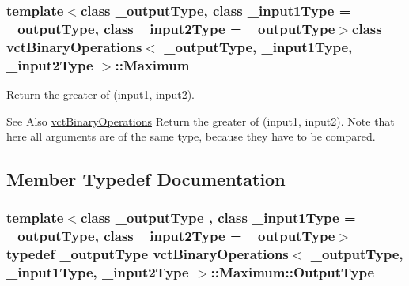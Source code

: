 \subsubsection*{template$<$class \-\_\-output\-Type, class \-\_\-input1\-Type = \-\_\-output\-Type, class \-\_\-input2\-Type = \-\_\-output\-Type$>$class vct\-Binary\-Operations$<$ \-\_\-output\-Type, \-\_\-input1\-Type, \-\_\-input2\-Type $>$\-::\-Maximum}

Return the greater of (input1, input2). 

\begin{DoxySeeAlso}{See Also}
\hyperlink{classvct_binary_operations}{vct\-Binary\-Operations} Return the greater of (input1, input2). Note that here all arguments are of the same type, because they have to be compared. 
\end{DoxySeeAlso}


\subsection{Member Typedef Documentation}
\hypertarget{classvct_binary_operations_1_1_maximum_abfe4fd3b0f4c1b3dc210114bff1e92dc}{
\subsubsection[{Output\-Type}]{\setlength{\rightskip}{0pt plus 5cm}template$<$class \-\_\-output\-Type , class \-\_\-input1\-Type  = \-\_\-output\-Type, class \-\_\-input2\-Type  = \-\_\-output\-Type$>$ typedef \-\_\-output\-Type {\bf vct\-Binary\-Operations}$<$ \-\_\-output\-Type, \-\_\-input1\-Type, \-\_\-input2\-Type $>$\-::{\bf Maximum\-::\-Output\-Type}}}\label{classvct_binary_operations_1_1_maximum_abfe4fd3b0f4c1b3dc210114bff1e92dc}



